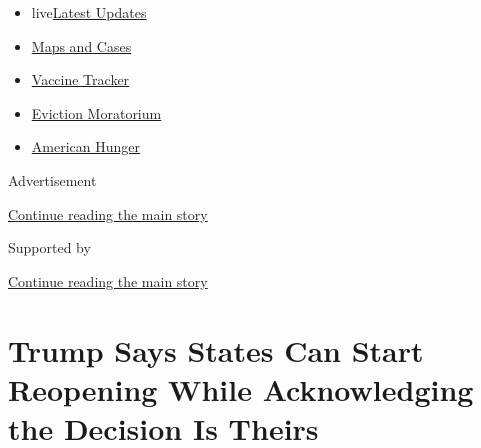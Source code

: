\begin{itemize}
\tightlist
\item
  live\href{https://www.nytimes3xbfgragh.onion/2020/09/09/world/covid-19-coronavirus.html?name=styln-coronavirus-national\&region=TOP_BANNER\&block=storyline_menu_recirc\&action=click\&pgtype=Article\&impression_id=ef06f8e0-f292-11ea-b230-4985fadaf784\&variant=undefined}{Latest
  Updates}
\item
  \href{https://www.nytimes3xbfgragh.onion/interactive/2020/us/coronavirus-us-cases.html?name=styln-coronavirus-national\&region=TOP_BANNER\&block=storyline_menu_recirc\&action=click\&pgtype=Article\&impression_id=ef06f8e1-f292-11ea-b230-4985fadaf784\&variant=undefined}{Maps
  and Cases}
\item
  \href{https://www.nytimes3xbfgragh.onion/interactive/2020/science/coronavirus-vaccine-tracker.html?name=styln-coronavirus-national\&region=TOP_BANNER\&block=storyline_menu_recirc\&action=click\&pgtype=Article\&impression_id=ef06f8e2-f292-11ea-b230-4985fadaf784\&variant=undefined}{Vaccine
  Tracker}
\item
  \href{https://www.nytimes3xbfgragh.onion/2020/09/02/your-money/eviction-moratorium-covid.html?name=styln-coronavirus-national\&region=TOP_BANNER\&block=storyline_menu_recirc\&action=click\&pgtype=Article\&impression_id=ef06f8e3-f292-11ea-b230-4985fadaf784\&variant=undefined}{Eviction
  Moratorium}
\item
  \href{https://www.nytimes3xbfgragh.onion/interactive/2020/09/02/magazine/food-insecurity-hunger-us.html?name=styln-coronavirus-national\&region=TOP_BANNER\&block=storyline_menu_recirc\&action=click\&pgtype=Article\&impression_id=ef06f8e4-f292-11ea-b230-4985fadaf784\&variant=undefined}{American
  Hunger}
\end{itemize}

Advertisement

\protect\hyperlink{after-top}{Continue reading the main story}

Supported by

\protect\hyperlink{after-sponsor}{Continue reading the main story}

\hypertarget{trump-says-states-can-start-reopening-while-acknowledging-the-decision-is-theirs}{%
\section{Trump Says States Can Start Reopening While Acknowledging the
Decision Is
Theirs}\label{trump-says-states-can-start-reopening-while-acknowledging-the-decision-is-theirs}}

